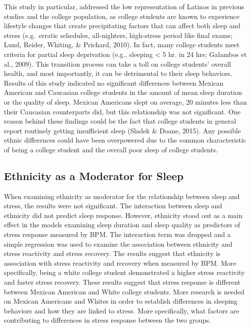 \documentclass[man, fleqn, noextraspace]{apa6}
\begin{document}
This study in particular, addressed the low representation of Latinos in previous studies and the college population, as college students are known to experience lifestyle changes that create precipitating factors that can affect both sleep and stress (e.g.~erratic schedules, all-nighters, high-stress period like final exams; Lund, Reider, Whiting, \& Prichard, 2010). In fact, many college students meet criteria for partial sleep deprivation (e.g., sleeping \textless{} 5 hr. in 24 hrs; Galambos et al., 2009). This transition process can take a toll on college students' overall health, and most importantly, it can be detrimental to their sleep behaviors. Results of this study indicated no significant differences between Mexican American and Caucasian college students in the amount of mean sleep duration or the quality of sleep. Mexican Americans slept on average, 20 minutes less than their Caucasian counterparts did, but this relationship was not significant. One reason behind these findings could be the fact that college students in general report routinely getting insufficient sleep (Sladek \& Doane, 2015). Any possible ethnic differences could have been overpowered due to the common characteristic of being a college student and the overall poor sleep of college students.

\hypertarget{ethnicity-as-a-moderator-for-sleep}{%
\subsection{Ethnicity as a Moderator for Sleep}\label{ethnicity-as-a-moderator-for-sleep}}

When examining ethnicity as moderator for the relationship between sleep and stress, the results were not significant. The interaction between sleep and ethnicity did not predict sleep response. However, ethnicity stood out as a main effect in the models examining sleep duration and sleep quality as predictors of stress response measured by BPM. The interaction term was dropped and a simple regression was used to examine the association between ethnicity and stress reactivity and stress recovery. The results suggest that ethnicity is association with stress reactivity and recovery when measured by BPM. More specifically, being a white college student demonstrated a higher stress reactivity and faster stress recovery. These results suggest that stress response is different between Mexican American and White college students. More research is needed on Mexican Americans and Whites in order to establish differences in sleeping behaviors and how they are linked to stress. More specifically, what factors are contributing to differences in stress response between the two groups.
\end{document}
